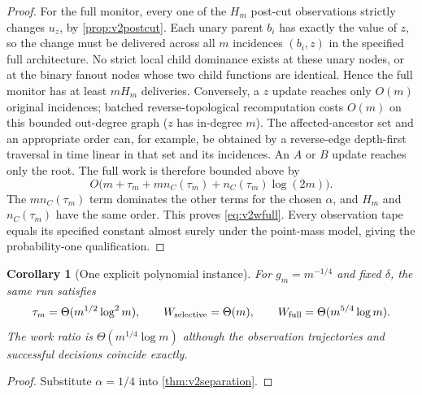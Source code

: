 \documentclass{article}
\theoremstyle{plain}
\newtheorem{corollary}[theorem]{Corollary}
\theoremstyle{definition}
\begin{document}
\begin{proof}
For the full monitor, every one of the $H_m$ post-cut observations
strictly changes $u_z$, by \cref{prop:v2postcut}. Each unary parent
$b_i$ has exactly the value of $z$, so the change must be delivered
across all $m$ incidences $(b_i,z)$ in the specified full architecture.
No strict local child dominance exists at these unary nodes, or at
the binary fanout nodes whose two child functions are identical.
Hence the full monitor has at least $mH_m$ deliveries. Conversely,
a $z$ update reaches only $O(m)$ original incidences; batched
reverse-topological recomputation costs $O(m)$ on this bounded out-degree
graph ($z$ has in-degree $m$). The affected-ancestor set and an appropriate order can, for
example, be obtained by a reverse-edge depth-first traversal in time
linear in that set and its incidences. An $A$ or $B$ update reaches
only the root. The full work is therefore bounded above by
\[
 O\big(m+\tau_m+m n_C(\tau_m)
                 +n_C(\tau_m)\log(2m)\big).
\]
The $m n_C(\tau_m)$ term dominates the other terms for the chosen
$\alpha$, and $H_m$ and $n_C(\tau_m)$ have the same order. This proves
\eqref{eq:v2wfull}. Every observation tape equals its specified constant
almost surely under the point-mass model, giving the probability-one
qualification.
\end{proof}

\begin{corollary}[One explicit polynomial instance]
\label{cor:v2quarter}
For $g_m=m^{-1/4}$ and fixed $\delta$, the same run satisfies
\[
 \tau_m=\Theta(m^{1/2}\log^2m),\qquad
 W_{\rm selective}=\Theta(m),\qquad
 W_{\rm full}=\Theta(m^{5/4}\log m).
\]
The work ratio is $\Theta(m^{1/4}\log m)$ although the observation
trajectories and successful decisions coincide exactly.
\end{corollary}
\begin{proof}
Substitute $\alpha=1/4$ into \cref{thm:v2separation}.
\end{proof}
\end{document}
